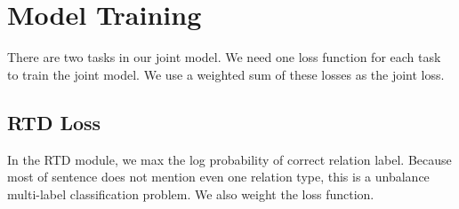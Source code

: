 \section{Model Training}
\label{sec:train}

There are two tasks in our joint model. We need one loss function for each 
task to train the joint model. We use a weighted sum of these losses as
the joint loss.

%
%
%
%

\subsection{RTD Loss}
In the RTD module, we max the log probability of correct relation label. Because
most of sentence does not mention even one relation type, this is a unbalance
multi-label classification problem. We also weight the loss function.

